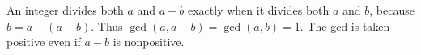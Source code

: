 An integer divides both $a$ and $a-b$ exactly when it divides both $a$ and $b$, because $b=a-(a-b)$. Thus $\gcd(a,a-b)=\gcd(a,b)=\boxed{1}$. The gcd is taken positive even if $a-b$ is nonpositive.
